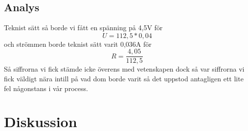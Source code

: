 \documentclass[11p]{article}
\begin{document}
    \subsection{Analys}
    Teknist sätt så borde vi fått en spänning på 4,5V för \begin{equation} U = 112,5 * 0,04 \end{equation} och strömmen borde teknist sätt varit 0,036A för \begin{equation} R = \frac{4,05}{112,5}\end{equation}
Så siffrorna vi fick stämde icke överens med vetenskapen dock så var siffrorna vi fick väldigt nära intill på vad dom borde varit så det uppstod antagligen ett lite fel någonstans i vår process.
    \section{Diskussion}
\end{document}
